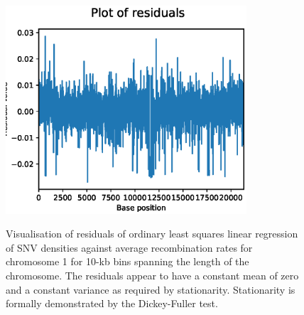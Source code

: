 \documentclass[12pt]{article}%
\begin{document}
\newpage

\begin{figure}[h!]
\center
\includegraphics[width=0.8\textwidth]{figs/correlation_plot_supp_a.eps}
\caption{Visualisation of residuals of ordinary least squares linear regression of SNV densities against average recombination rates for chromosome 1 for 10-kb bins spanning the length of the chromosome. The residuals appear to have a constant mean of zero and a constant variance as required by stationarity. Stationarity is formally demonstrated by the Dickey-Fuller test.}
{\label{fig:residuals}}
\end{figure}

\newpage
\end{document}
